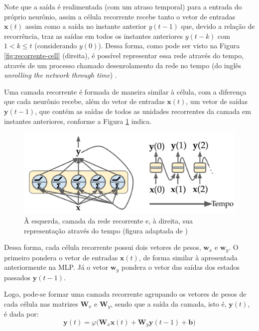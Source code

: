 \documentclass[a4paper, 12pt]{article}
\begin{document}
Note que a saída é realimentada (com um atraso temporal) para a entrada do próprio neurônio, assim a célula recorrente recebe tanto o vetor de entradas $\mathbf{x}(t)$ assim como a saída no instante anterior $y(t-1)$ que, devido a relação de recorrência, traz as saídas em todos os instantes anteriores $y(t-k)$ com $1 < k \leq t$ (considerando $y(0)$). Dessa forma, como pode ser visto na Figura \ref{fig:recorrente-cell} (direita), é possível representar essa rede através do tempo, através de um processo chamado desenrolamento da rede no tempo (do inglês \textit{unrolling the network through time}) \cite{geron2019hands}.

Uma camada recorrente é formada de maneira similar à célula, com a diferença que cada neurônio recebe, além do vetor de entradas $\mathbf{x}(t)$, um vetor de saídas $\mathbf{y}(t-1)$, que contém as saídas de todos as unidades recorrentes da camada em instantes anteriores, conforme a Figura \ref{fig:recorrente-camada} indica. 
\begin{figure}[H]
\centering
\includegraphics[scale = 0.25]{rnn-layer.pdf}
\caption{À esquerda, camada da rede recorrente e, à direita, sua representação através do tempo (figura adaptada de \cite{geron2019hands})}
\label{fig:recorrente-camada}
\end{figure}

Dessa forma, cada célula recorrente possui dois vetores de pesos, $\mathbf{w}_x$ e $\mathbf{w}_y$. O primeiro pondera o vetor de entradas $\mathbf{x}(t)$, de forma similar à apresentada anteriormente na MLP. Já o vetor $\mathbf{w}_y$ pondera o vetor das saídas dos estados passados $\mathbf{y}(t-1)$.

Logo, pode-se formar uma camada recorrente agrupando os vetores de pesos de cada célula nas matrizes $\mathbf{W}_x$ e $\mathbf{W}_y$, sendo que a saída da camada, isto é, $\mathbf{y}(t)$, é dada por:
\begin{equation}\label{eq:rnn-layer}
\mathbf{y}(t) = \varphi \big(\mathbf{W}_x \mathbf{x}(t) + \mathbf{W}_y \mathbf{y}(t-1) + \mathbf{b} \big)
\end{equation}
\end{document}
